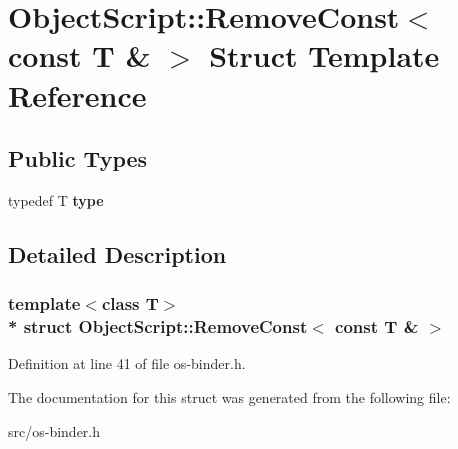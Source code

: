 \hypertarget{struct_object_script_1_1_remove_const_3_01const_01_t_01_6_01_4}{}\section{Object\+Script\+:\+:Remove\+Const$<$ const T \& $>$ Struct Template Reference}
\label{struct_object_script_1_1_remove_const_3_01const_01_t_01_6_01_4}
\subsection*{Public Types}
\begin{DoxyCompactItemize}
\item 
typedef T {\bfseries type}\hypertarget{struct_object_script_1_1_remove_const_3_01const_01_t_01_6_01_4_aec366bde9f6cea3629640bea8d2cc4af}{}\label{struct_object_script_1_1_remove_const_3_01const_01_t_01_6_01_4_aec366bde9f6cea3629640bea8d2cc4af}

\end{DoxyCompactItemize}


\subsection{Detailed Description}
\subsubsection*{template$<$class T$>$\\*
struct Object\+Script\+::\+Remove\+Const$<$ const T \& $>$}



Definition at line 41 of file os-\/binder.\+h.



The documentation for this struct was generated from the following file\+:\begin{DoxyCompactItemize}
\item 
src/os-\/binder.\+h\end{DoxyCompactItemize}

